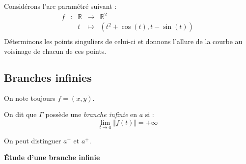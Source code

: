 \documentclass[a4paper,10pt]{report}
\begin{document}
\medskip

\begin{ex} Considérons l'arc paramétré suivant :
$$ \begin{array}{lllll}
f & : & \mathbb{R} & \rightarrow & \mathbb{R}^2 \\
& & t & \mapsto &(t^2+ \cos(t), t- \sin(t)) \\
\end{array}$$
Déterminons les points singuliers de celui-ci et donnons l'allure de la courbe au voisinage de chacun de ces points.

\vspace{9cm}
\end{ex}

\subsection{Branches infinies}
\noindent On note toujours $f=(x,y)$.

\begin{defin} On dit que $\Gamma$ possède une \textit{branche infinie} en $a$ si :
$$ \lim_{t \rightarrow a} \Vert f(t) \Vert = + \infty$$
\end{defin}

\begin{rem} On peut distinguer $a^{-}$ et $a^{+}$.
\end{rem}

\medskip

\begin{center}
 \textbf{Étude d'une branche infinie}
 \end{center} 
 
\end{document}
